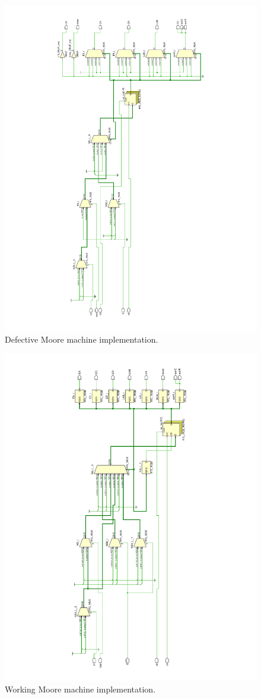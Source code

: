 \documentclass{article}
\begin{document}
\begin{figure}[H]
    \centering
    \includegraphics[height=\textwidth, angle=-90]{Images/schematic1}
    \caption{Defective Moore machine implementation.}
    \label{blockdiagram:moore1}
\end{figure}
\begin{figure}[H]
    \centering
    \includegraphics[height=\textwidth, angle=-90]{Images/schematic2}
    \caption{Working Moore machine implementation.}
    \label{blockdiagram:moore2}
\end{figure}
\end{document}
